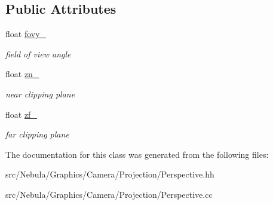 \subsection*{\-Public \-Attributes}
\begin{DoxyCompactItemize}
\item 
\hypertarget{classNeb_1_1Graphics_1_1Camera_1_1Projection_1_1Perspective_a78678bcad94b1f9e931e3f6dc94040ed}{float \hyperlink{classNeb_1_1Graphics_1_1Camera_1_1Projection_1_1Perspective_a78678bcad94b1f9e931e3f6dc94040ed}{fovy\-\_\-}}\label{classNeb_1_1Graphics_1_1Camera_1_1Projection_1_1Perspective_a78678bcad94b1f9e931e3f6dc94040ed}

\begin{DoxyCompactList}\small\item\em field of view angle \end{DoxyCompactList}\item 
\hypertarget{classNeb_1_1Graphics_1_1Camera_1_1Projection_1_1Perspective_a656c7e0c13ed9999a93266485564aef6}{float \hyperlink{classNeb_1_1Graphics_1_1Camera_1_1Projection_1_1Perspective_a656c7e0c13ed9999a93266485564aef6}{zn\-\_\-}}\label{classNeb_1_1Graphics_1_1Camera_1_1Projection_1_1Perspective_a656c7e0c13ed9999a93266485564aef6}

\begin{DoxyCompactList}\small\item\em near clipping plane \end{DoxyCompactList}\item 
\hypertarget{classNeb_1_1Graphics_1_1Camera_1_1Projection_1_1Perspective_aacdfc451bc0483cb19e3ddec42e6adf0}{float \hyperlink{classNeb_1_1Graphics_1_1Camera_1_1Projection_1_1Perspective_aacdfc451bc0483cb19e3ddec42e6adf0}{zf\-\_\-}}\label{classNeb_1_1Graphics_1_1Camera_1_1Projection_1_1Perspective_aacdfc451bc0483cb19e3ddec42e6adf0}

\begin{DoxyCompactList}\small\item\em far clipping plane \end{DoxyCompactList}\end{DoxyCompactItemize}


\-The documentation for this class was generated from the following files\-:\begin{DoxyCompactItemize}
\item 
src/\-Nebula/\-Graphics/\-Camera/\-Projection/\-Perspective.\-hh\item 
src/\-Nebula/\-Graphics/\-Camera/\-Projection/\-Perspective.\-cc\end{DoxyCompactItemize}
